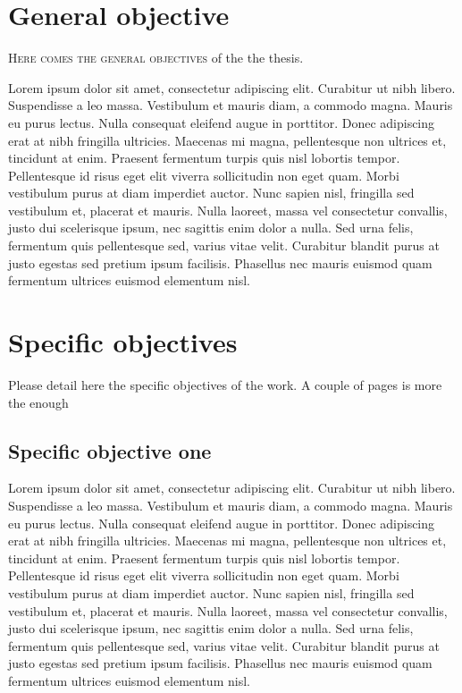 

\section*{General objective}

\lettrine{H}{ere comes the general objectives} of the the thesis.

Lorem ipsum dolor sit amet, consectetur adipiscing elit. Curabitur ut nibh libero. Suspendisse a leo massa. Vestibulum et mauris diam, a commodo magna. Mauris eu purus lectus. Nulla consequat eleifend augue in porttitor. Donec adipiscing erat at nibh fringilla ultricies. Maecenas mi magna, pellentesque non ultrices et, tincidunt at enim. Praesent fermentum turpis quis nisl lobortis tempor. Pellentesque id risus eget elit viverra sollicitudin non eget quam. Morbi vestibulum purus at diam imperdiet auctor. Nunc sapien nisl, fringilla sed vestibulum et, placerat et mauris. Nulla laoreet, massa vel consectetur convallis, justo dui scelerisque ipsum, nec sagittis enim dolor a nulla. Sed urna felis, fermentum quis pellentesque sed, varius vitae velit. Curabitur blandit purus at justo egestas sed pretium ipsum facilisis. Phasellus nec mauris euismod quam fermentum ultrices euismod elementum nisl.


\section*{Specific objectives}

Please detail here the specific objectives of the work. A couple of pages is more the enough

\subsection{Specific objective one}

Lorem ipsum dolor sit amet, consectetur adipiscing elit. Curabitur ut nibh libero. Suspendisse a leo massa. Vestibulum et mauris diam, a commodo magna. Mauris eu purus lectus. Nulla consequat eleifend augue in porttitor. Donec adipiscing erat at nibh fringilla ultricies. Maecenas mi magna, pellentesque non ultrices et, tincidunt at enim. Praesent fermentum turpis quis nisl lobortis tempor. Pellentesque id risus eget elit viverra sollicitudin non eget quam. Morbi vestibulum purus at diam imperdiet auctor. Nunc sapien nisl, fringilla sed vestibulum et, placerat et mauris. Nulla laoreet, massa vel consectetur convallis, justo dui scelerisque ipsum, nec sagittis enim dolor a nulla. Sed urna felis, fermentum quis pellentesque sed, varius vitae velit. Curabitur blandit purus at justo egestas sed pretium ipsum facilisis. Phasellus nec mauris euismod quam fermentum ultrices euismod elementum nisl.

